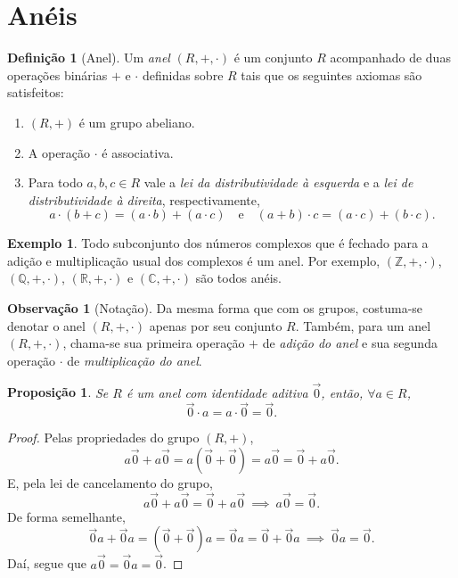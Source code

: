 \documentclass[a4paper,12pt]{article}
\theoremstyle{plain}
\newtheorem{proposicao}{Proposição}[section]
\theoremstyle{definition}
\newtheorem{definicao}{Definição}[section]
\newtheorem{observacao}{Observação}[section]
\newtheorem{exemplo}{Exemplo}[section]
\begin{document}
	\section{Anéis}
	
	\begin{definicao}[Anel]
		Um \emph{anel} $(R, +, \cdot)$ é um conjunto $R$ acompanhado de duas operações binárias $+$ e $\cdot$ definidas sobre $R$ tais que os seguintes axiomas são satisfeitos:
		\begin{enumerate}
			\item $(R, +)$ é um grupo abeliano.
			\item A operação $\cdot$ é associativa.
			\item Para todo $a,b,c\in R$ vale a \emph{lei da distributividade à esquerda} e a \emph{lei de distributividade à direita}, respectivamente, $$a\cdot(b+c) = (a\cdot b) + (a\cdot c)\quad \text{e} \quad (a+b)\cdot c = (a\cdot c) + (b\cdot c).$$
		\end{enumerate}
	\end{definicao}
	
	\begin{exemplo}
		Todo subconjunto dos números complexos que é fechado para a adição e multiplicação usual dos complexos é um anel. Por exemplo, $(\mathbb{Z}, +, \cdot)$, $(\mathbb{Q}, +, \cdot)$, $(\mathbb{R}, +, \cdot)$ e $(\mathbb{C}, +, \cdot)$ são todos anéis.
	\end{exemplo}
	
	\begin{observacao}[Notação]
		 Da mesma forma que com os grupos, costuma-se denotar o anel $(R, +, \cdot)$ apenas por seu conjunto $R$. Também, para um anel $(R, +, \cdot)$, chama-se sua primeira operação $+$ de \emph{adição do anel} e sua segunda operação $\cdot$ de \emph{multiplicação do anel}. 
	\end{observacao}

	\begin{proposicao}
		Se $R$ é um anel com identidade aditiva $\vec 0$, então, $\forall a \in R$, $$\vec 0 \cdot a = a \cdot \vec 0 = \vec 0.$$
	\end{proposicao}
	\begin{proof}
		Pelas propriedades do grupo $(R, +)$, $$a\vec 0 + a\vec 0 = a(\vec 0 + \vec 0) = a\vec 0 = \vec 0 + a\vec 0.$$ E, pela lei de cancelamento do grupo, $$a\vec0 + a\vec 0 = \vec 0 + a\vec 0 \ \implies \ a\vec 0 = \vec 0.$$
		De forma semelhante, $$\vec 0a + \vec 0a = (\vec 0 + \vec 0)a = \vec 0a = \vec 0 + \vec 0a \ \implies \ \vec 0a = \vec 0.$$ Daí, segue que $a\vec 0 = \vec 0a = \vec 0$. 
	\end{proof}
\end{document}
